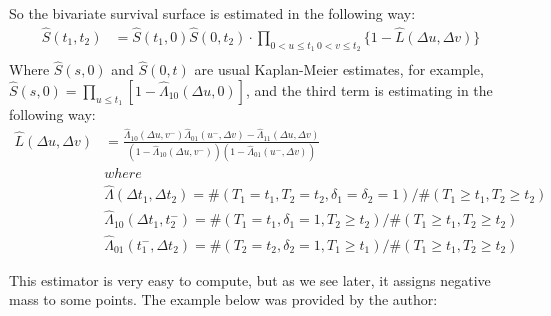 \documentclass[]{article}
\begin{document}
So the bivariate survival surface is estimated in the following way:
	$$
	\begin{aligned}
		\hat{S}(t_1,t_2) &= \hat{S}(t_1,0)\hat{S}(0,t_2)\cdot \prod_{{0<u\leq t_1~0<v\leq t_2}}\{1 - \hat{L}(\Delta u, \Delta v)\}\\
	\end{aligned}
	$$
Where $\hat{S}(s,0)$ and $\hat{S}(0,t)$ are usual Kaplan-Meier estimates, for example, $\hat{S}(s,0) = \prod_{u\leq t_1}[1-\hat{\Lambda}_{10}(\Delta u, 0)]$, and the third term is estimating in the following way:
	$$
	\begin{aligned}
    \hat{L}(\Delta u, \Delta v) &= \frac{\hat{\Lambda}_{10}(\Delta u,v^-)\hat{\Lambda}_{01}(u^-,\Delta v) - \hat{\Lambda}_{11}(\Delta u,\Delta v)}{\left(1-\hat{\Lambda}_{10}(\Delta u,v^-)\right)\left(1-\hat{\Lambda}_{01}(u^-,\Delta v)\right)}\\
  &where\\
	&\hat{\Lambda}(\Delta t_1, \Delta t_2) = \#(T_1=t_1, T_2=t_2, \delta_1=\delta_2=1)/\#(T_1\geq t_1, T_2\geq t_2)\\
	&\hat{\Lambda}_{10}(\Delta t_1, t_2^-) = \#(T_1=t_1, \delta_1=1, T_2\geq t_2)/\#(T_1\geq t_1, T_2\geq t_2)\\
	&\hat{\Lambda}_{01}(t_1^-,\Delta  t_2) = \#(T_2=t_2, \delta_2=1, T_1\geq t_1)/\#(T_1\geq t_1, T_2\geq t_2)
	\end{aligned}
	$$

This estimator is very easy to compute, but as we see later, it assigns negative mass to some points. The example below was provided by the author:
\end{document}
